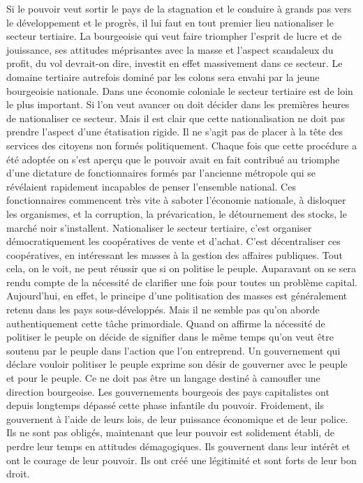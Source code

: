 \documentclass[french,twoside]{book} %
\begin{document}
Si le pouvoir veut sortir le pays de la stagnation et le conduire à grands pas vers le développement et le progrès, il lui faut en tout premier lieu nationaliser le secteur tertiaire. La bourgeoisie qui veut faire triompher l’esprit de lucre et de jouissance, ses attitudes méprisantes avec la masse et l’aspect scandaleux du profit, du vol devrait-on dire, investit en effet massivement dans ce secteur. Le domaine tertiaire autrefois dominé par les colons sera envahi par la jeune bourgeoisie nationale. Dans une économie coloniale le secteur tertiaire est de loin le plus important. Si l’on veut avancer on doit décider dans les premières heures de nationaliser ce secteur. Mais il est clair que cette nationalisation ne doit pas prendre l’aspect d’une étatisation rigide. Il ne s’agit pas de placer à la tête des services des citoyens non formés politiquement. Chaque fois que cette procédure a été adoptée on s’est aperçu que le pouvoir avait en fait contribué au triomphe d’une dictature de fonctionnaires formés par l’ancienne métropole qui se révélaient rapidement incapables de penser l’ensemble national. Ces fonctionnaires commencent très vite à saboter l’économie nationale, à disloquer les organismes, et la corruption, la prévarication, le détournement des stocks, le marché noir s’installent. Nationaliser le secteur tertiaire, c’est organiser démocratiquement les coopératives de vente et d’achat. C’est décentraliser ces coopératives, en intéressant les masses à la gestion des affaires publiques. Tout cela,   on le voit, ne peut réussir que si on politise le peuple. Auparavant on se sera rendu compte de la nécessité de clarifier une fois pour toutes un problème capital. Aujourd’hui, en effet, le principe d’une politisation des masses est généralement retenu dans les pays sous-développés. Mais il ne semble pas qu’on aborde authentiquement cette tâche primordiale. Quand on affirme la nécessité de politiser le peuple on décide de signifier dans le même temps qu’on veut être soutenu par le peuple dans l’action que l’on entreprend. Un gouvernement qui déclare vouloir politiser le peuple exprime son désir de gouverner avec le peuple et pour le peuple. Ce ne doit pas être un langage destiné à camoufler une direction bourgeoise. Les gouvernements bourgeois des pays capitalistes ont depuis longtemps dépassé cette phase infantile du pouvoir. Froidement, ils gouvernent à l’aide de leurs lois, de leur puissance économique et de leur police. Ils ne sont pas obligés, maintenant que leur pouvoir est solidement établi, de perdre leur temps en attitudes démagogiques. Ils gouvernent dans leur intérêt et ont le courage de leur pouvoir. Ils ont créé une légitimité et sont forts de leur bon droit.\par
\end{document}
